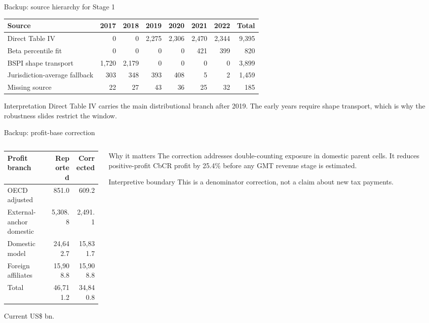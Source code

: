 \documentclass[aspectratio=169, 11pt]{beamer}
\newcommand{\sourceline}[1]{}
\begin{document}
\begin{frame}{Backup: source hierarchy for Stage 1}
\small
\begin{center}
\scriptsize
\begin{tabular}{@{}lrrrrrrr@{}}
  \toprule
  Source & 2017 & 2018 & 2019 & 2020 & 2021 & 2022 & Total \\
  \midrule
  Direct Table IV & 0 & 0 & 2,275 & 2,306 & 2,470 & 2,344 & 9,395 \\
  Beta percentile fit & 0 & 0 & 0 & 0 & 421 & 399 & 820 \\
  BSPI shape transport & 1,720 & 2,179 & 0 & 0 & 0 & 0 & 3,899 \\
  Jurisdiction-average fallback & 303 & 348 & 393 & 408 & 5 & 2 & 1,459 \\
  Missing source & 22 & 27 & 43 & 36 & 25 & 32 & 185 \\
  \bottomrule
\end{tabular}
\end{center}
\begin{block}{Interpretation}
  Direct Table IV carries the main distributional branch after 2019. The early years require shape transport, which is why the robustness slides restrict the window.
\end{block}
\sourceline{generated Table stage1\_source\_coverage}
\end{frame}

\begin{frame}{Backup: profit-base correction}
\small
\begin{columns}[T]
\begin{column}{0.48\textwidth}
\begin{center}
\scriptsize
\begin{tabular}{@{}lrr@{}}
  \toprule
  Profit branch & Reported & Corrected \\
  \midrule
  OECD adjusted & 851.0 & 609.2 \\
  External-anchor domestic & 5,308.8 & 2,491.1 \\
  Domestic model & 24,642.7 & 15,831.7 \\
  Foreign affiliates & 15,908.8 & 15,908.8 \\
  \midrule
  Total & 46,711.2 & 34,840.8 \\
  \bottomrule
\end{tabular}
\end{center}
\tiny Current US\$ bn.
\end{column}
\begin{column}{0.48\textwidth}
\begin{block}{Why it matters}
  The correction addresses double-counting exposure in domestic parent cells. It reduces positive-profit CbCR profit by 25.4\% before any GMT revenue stage is estimated.
\end{block}
\begin{alertblock}{Interpretive boundary}
  This is a denominator correction, not a claim about new tax payments.
\end{alertblock}
\end{column}
\end{columns}
\sourceline{generated Table profit\_correction\_effects}
\end{frame}
\end{document}
